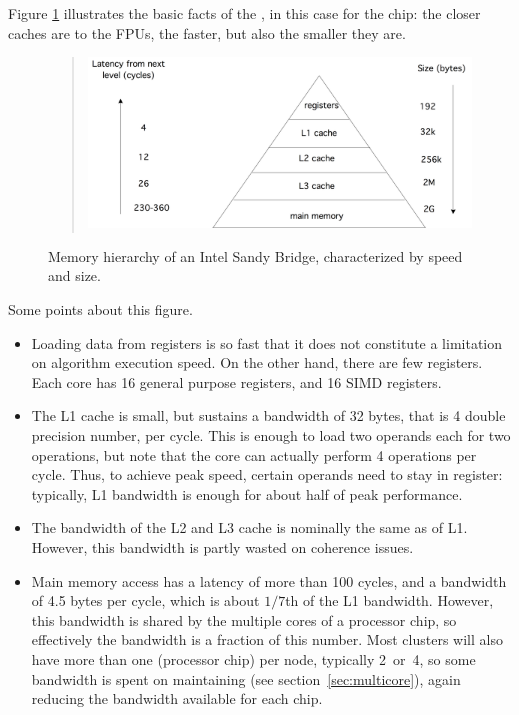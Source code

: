 Figure \ref{fig:hierarchy} illustrates the basic facts of the
, in
this case for the  chip: the
closer caches are to the \acp{FPU}, the faster, but also the
smaller they are.
\begin{figure}[ht]
  \begin{quote}
  \includegraphics[scale=.11]{graphics/hierarchysb}
  \end{quote}
  \caption{Memory hierarchy of an Intel Sandy Bridge, characterized by speed and size.}
  \label{fig:hierarchy}
\end{figure}
Some points about this figure.
\begin{itemize}
\item Loading data from registers is so fast that it does not
  constitute a limitation on algorithm execution speed. On the other
  hand, there are few registers. Each core has 16 general purpose
  registers, and 16 SIMD registers.
\item The L1 cache is small, but sustains a bandwidth of 32 bytes,
  that is 4 double precision number, per cycle. This is enough to load
  two operands each for two operations, but note that the core can
  actually perform 4 operations per cycle. Thus, to achieve peak
  speed, certain operands need to stay in register: typically, L1 
  bandwidth is enough for about half of peak performance.
\item The bandwidth of the L2 and L3 cache is nominally the same as
  of L1. However, this bandwidth is partly wasted on coherence issues.
\item Main memory access has a latency of more than 100 cycles, and a
  bandwidth of 4.5 bytes per cycle, which is about $1/7$th of the L1
  bandwidth. However, this bandwidth is shared by the multiple cores
  of a processor chip, so effectively the bandwidth is a fraction of
  this number. Most clusters will also have more than one
   (processor chip) per node, typically 2~or~4, so
  some bandwidth is spent on maintaining
   (see section~\ref{sec:multicore}),
  again reducing the bandwidth available for each chip.
\end{itemize}


